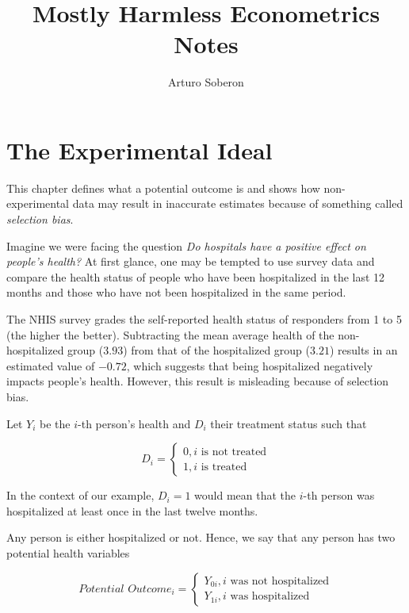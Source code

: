 \documentclass[12pt]{article}
\begin{document}
\title{Mostly Harmless Econometrics Notes}
\author{Arturo Soberon}
\date{}
\maketitle

\setcounter{section}{1}
\section{The Experimental Ideal}
This chapter defines what a potential outcome is and shows how non-experimental
data may result in inaccurate estimates because of something called 
\textit{selection bias}.

Imagine we were facing the question \textit{Do hospitals have a positive
effect on people's health?} At first glance, one may be tempted to use survey
data and compare the health status of people who have been hospitalized in the
last 12 months and those who have not been hospitalized in the same period.

The NHIS survey grades the self-reported health status of responders from 1 to 
5 (the higher the better). Subtracting the mean average health of the
non-hospitalized group ($3.93$) from that of the hospitalized group ($3.21$)
results in an estimated value of $-0.72$, which suggests that being
hospitalized negatively impacts people's health. However, this result is
misleading because of selection bias.

Let $Y_i$ be the $i$-th person's health and $D_i$ their treatment status such
that

\begin{equation*}
    D_i = 
    \begin{cases}
        0, \text{$i$ is not treated} \\
        1, \text{$i$ is treated}
    \end{cases}
\end{equation*}

In the context of our example, $D_i = 1$ would mean that the $i$-th
person was hospitalized at least once in the last twelve months.

Any person is either hospitalized or not. Hence, we say that any person has two
potential health variables

\begin{equation*}
    \textit{Potential Outcome}_i = 
    \begin{cases}
        Y_{0i}, \text{$i$ was not hospitalized} \\
        Y_{1i}, \text{$i$ was hospitalized}
    \end{cases}
\end{equation*}
\end{document}
